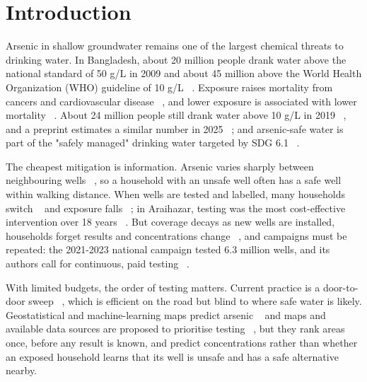 \documentclass[sustainability,article,submit,pdftex,moreauthors]{Definitions/mdpi}
\begin{document}
\section{Introduction}

Arsenic in shallow groundwater remains one of the largest chemical threats to drinking water. In Bangladesh, about 20 million people drank water above the national standard of 50 \textmu{}g/L in 2009 and about 45 million above the World Health Organization (WHO) guideline of 10 \textmu{}g/L ~\cite{Flanagan2012}. Exposure raises mortality from cancers and cardiovascular disease ~\cite{Argos2010,Naujokas2013}, and lower exposure is associated with lower mortality ~\cite{Wu2025}. About 24 million people still drank water above 10 \textmu{}g/L in 2019 ~\cite{Pakkos2026}, and a preprint estimates a similar number in 2025 ~\cite{Hoque2026}; and arsenic-safe water is part of the "safely managed" drinking water targeted by SDG 6.1 ~\cite{Bain2018,Fischer2020}.

The cheapest mitigation is information. Arsenic varies sharply between neighbouring wells ~\cite{vanGeen2003,Yu2003}, so a household with an unsafe well often has a safe well within walking distance. When wells are tested and labelled, many households switch ~\cite{Madajewicz2007,Opar2007,vanGeen2019} and exposure falls ~\cite{Chen2007,Huhmann2019}; in Araihazar, testing was the most cost-effective intervention over 18 years ~\cite{Jamil2019}. But coverage decays as new wells are installed, households forget results and concentrations change ~\cite{George2012b,vanGeen2014,Pfaff2017,Yao2021}, and campaigns must be repeated: the 2021-2023 national campaign tested 6.3 million wells, and its authors call for continuous, paid testing ~\cite{Khan2025}.

With limited budgets, the order of testing matters. Current practice is a door-to-door sweep ~\cite{vanGeen2014,Johnston2007}, which is efficient on the road but blind to where safe water is likely. Geostatistical and machine-learning maps predict arsenic ~\cite{Gaus2003,Shamsudduha2015,Podgorski2020,Tan2020,Mehrabi2025,Zhao2024} and maps and available data sources are proposed to prioritise testing ~\cite{Podgorski2020,Azad2026,Katner2015}, but they rank areas once, before any result is known, and predict concentrations rather than whether an exposed household learns that its well is unsafe and has a safe alternative nearby.
\end{document}
